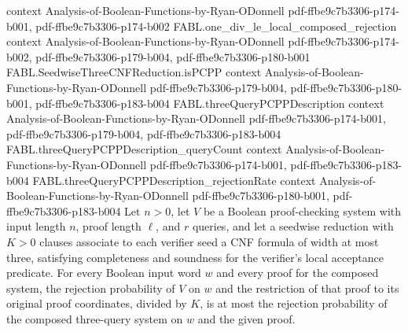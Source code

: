 \begin{theorem}
  {context}
  {Analysis-of-Boolean-Functions-by-Ryan-ODonnell}
  {pdf-ffbe9c7b3306-p174-b001,
    pdf-ffbe9c7b3306-p174-b002}
\proofstep
  {FABL.one_div_le_local_composed_rejection}
  {context}
  {Analysis-of-Boolean-Functions-by-Ryan-ODonnell}
  {pdf-ffbe9c7b3306-p174-b002,
    pdf-ffbe9c7b3306-p179-b004,
    pdf-ffbe9c7b3306-p180-b001}
\proofstep
  {FABL.SeedwiseThreeCNFReduction.isPCPP}
  {context}
  {Analysis-of-Boolean-Functions-by-Ryan-ODonnell}
  {pdf-ffbe9c7b3306-p179-b004,
    pdf-ffbe9c7b3306-p180-b001,
    pdf-ffbe9c7b3306-p183-b004}
\proofstep
  {FABL.threeQueryPCPPDescription}
  {context}
  {Analysis-of-Boolean-Functions-by-Ryan-ODonnell}
  {pdf-ffbe9c7b3306-p174-b001,
    pdf-ffbe9c7b3306-p179-b004,
    pdf-ffbe9c7b3306-p183-b004}
\proofstep
  {FABL.threeQueryPCPPDescription_queryCount}
  {context}
  {Analysis-of-Boolean-Functions-by-Ryan-ODonnell}
  {pdf-ffbe9c7b3306-p174-b001,
    pdf-ffbe9c7b3306-p183-b004}
\proofstep
  {FABL.threeQueryPCPPDescription_rejectionRate}
  {context}
  {Analysis-of-Boolean-Functions-by-Ryan-ODonnell}
  {pdf-ffbe9c7b3306-p180-b001,
    pdf-ffbe9c7b3306-p183-b004}
Let $n>0$, let $V$ be a Boolean proof-checking system with input length $n$, proof
length $\ell$, and $r$ queries, and let a seedwise reduction with $K>0$ clauses
associate to each verifier seed a CNF formula of width at most three, satisfying
completeness and soundness for the verifier’s local acceptance predicate. For every
Boolean input word $w$ and every proof for the composed system, the rejection
probability of $V$ on $w$ and the restriction of that proof to its original proof
coordinates, divided by $K$, is at most the rejection probability of the composed
three-query system on $w$ and the given proof.
\end{theorem}

